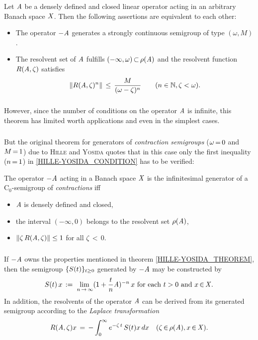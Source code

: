 \documentclass[11pt,twoside]{article}
\begin{document}
\begin{theorem1}\label{MAIN_THEOREM_OF_SEMIGROUP_THEORY}
Let $\mathit{A}$ be a densely defined and closed linear operator
acting in an arbitrary Banach space $\mathit{X}$.
Then the following assertions are equivalent to each other:

\begin{itemize}[leftmargin=9mm]
\item[(a)]
The operator ${-}\mathit{A}$ generates a strongly continuous semigroup
of type $(\omega,M)$.
\item[(b)]
The resolvent set of $\mathit{A}$ fulfills $(-\infty,\omega) {\,\subset\,} \rho(\mathit{A})$
and the resolvent function $R(\mathit{A},\zeta)$ satisfies
\begin{equation}\label{HILLE-YOSIDA_CONDITION}
\left\lVert R(\mathit{A},\zeta)^n \right\rVert \, \leq \,
\frac{M}{(\omega - \zeta)^n} \quad \quad (n \in {\mathbb{N}}, \zeta < \omega).
\end{equation}
\end{itemize}
\end{theorem1}

\subparagraph{}
However,
since the number of conditions on the operator $\mathit{A}$ is infinite,
this theorem has limited worth {\wrt} applications
and even in the simplest cases.

\subparagraph{} %
But the original theorem for generators of \textit{contraction semigroups}
($\omega {\,=\,} 0$ and $M {\,=\,} 1$)
due to \textsc{Hille} and \textsc{Yosida} quotes
that in this case only the first inequality
($n {\,=\,} 1$) in \eqref{HILLE-YOSIDA_CONDITION} has to be verified:

\begin{theorem1}\label{HILLE-YOSIDA_THEOREM}
The operator ${-}\mathit{A}$ acting in a Banach space $\mathit{X}$
is the infinitesimal generator of a C$_0$-semigroup of \textit{contractions}
iff

\begin{itemize}[leftmargin=9mm]
\item[(a)]
$\mathit{A}$ is densely defined and closed,
\item[(b)]
the interval $(-\infty,0)$ belongs to the resolvent set $\rho(\mathit{A})$,
\item[(c)]
$\left\lVert \zeta \, R(\mathit{A},\zeta)  \right\rVert \leq 1$ for all $\zeta {\,<\,} 0$.
\end{itemize}
\end{theorem1}

\subparagraph{} %
If ${-}\mathit{A}$ owns the properties
mentioned in theorem \ref{HILLE-YOSIDA_THEOREM},
then the semigroup $\{{S}(t)\}_{t \geq 0}$ generated by ${-}\mathit{A}$
may be constructed by
\[
{S}(t) \, x \,:=\,
\lim_{\,n {\,\to\,} \infty} ({\mathsf{1}} + \frac{t}{n} \mathit{A})^{-n} \,x 
\mbox{ for each } t > 0 \mbox{ and } x {\,\in\,} \mathit{X}.
\]
In addition,
the resolvents of the operator $\mathit{A}$ can be derived
from its generated semigroup according to the \textit{Laplace transformation}
\[
R(\mathit{A},\zeta)x \,=\, -\int_0^{\infty} e^{-\zeta \, t} \, S(t) x \, dx
\quad (\zeta {\,\in\,} \rho(\mathit{A}), x {\,\in\,} \mathit{X}).
\]
\end{document}
